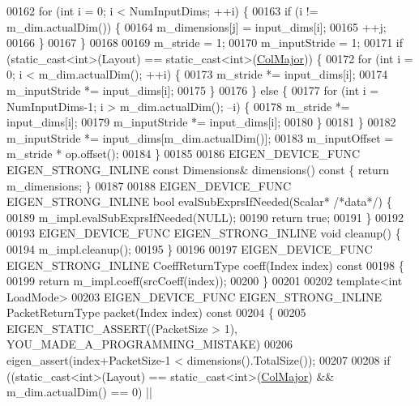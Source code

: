 \begin{DoxyCode}
00162     \textcolor{keywordflow}{for} (\textcolor{keywordtype}{int} i = 0; i < NumInputDims; ++i) \{
00163       \textcolor{keywordflow}{if} (i != m\_dim.actualDim()) \{
00164         m\_dimensions[j] = input\_dims[i];
00165         ++j;
00166       \}
00167     \}
00168 
00169     m\_stride = 1;
00170     m\_inputStride = 1;
00171     \textcolor{keywordflow}{if} (static\_cast<int>(Layout) == \textcolor{keyword}{static\_cast<}\textcolor{keywordtype}{int}\textcolor{keyword}{>}(\hyperlink{group__enums_ggaacded1a18ae58b0f554751f6cdf9eb13a0cbd4bdd0abcfc0224c5fcb5e4f6669a}{ColMajor})) \{
00172       \textcolor{keywordflow}{for} (\textcolor{keywordtype}{int} i = 0; i < m\_dim.actualDim(); ++i) \{
00173         m\_stride *= input\_dims[i];
00174         m\_inputStride *= input\_dims[i];
00175       \}
00176     \} \textcolor{keywordflow}{else} \{
00177       \textcolor{keywordflow}{for} (\textcolor{keywordtype}{int} i = NumInputDims-1; i > m\_dim.actualDim(); --i) \{
00178         m\_stride *= input\_dims[i];
00179         m\_inputStride *= input\_dims[i];
00180       \}
00181     \}
00182     m\_inputStride *= input\_dims[m\_dim.actualDim()];
00183     m\_inputOffset = m\_stride * op.offset();
00184   \}
00185 
00186   EIGEN\_DEVICE\_FUNC EIGEN\_STRONG\_INLINE \textcolor{keyword}{const} Dimensions& dimensions()\textcolor{keyword}{ const }\{ \textcolor{keywordflow}{return} m\_dimensions; \}
00187 
00188   EIGEN\_DEVICE\_FUNC EIGEN\_STRONG\_INLINE \textcolor{keywordtype}{bool} evalSubExprsIfNeeded(Scalar* \textcolor{comment}{/*data*/}) \{
00189     m\_impl.evalSubExprsIfNeeded(NULL);
00190     \textcolor{keywordflow}{return} \textcolor{keyword}{true};
00191   \}
00192 
00193   EIGEN\_DEVICE\_FUNC EIGEN\_STRONG\_INLINE \textcolor{keywordtype}{void} cleanup() \{
00194     m\_impl.cleanup();
00195   \}
00196 
00197   EIGEN\_DEVICE\_FUNC EIGEN\_STRONG\_INLINE CoeffReturnType coeff(Index index)\textcolor{keyword}{ const}
00198 \textcolor{keyword}{  }\{
00199     \textcolor{keywordflow}{return} m\_impl.coeff(srcCoeff(index));
00200   \}
00201 
00202   \textcolor{keyword}{template}<\textcolor{keywordtype}{int} LoadMode>
00203   EIGEN\_DEVICE\_FUNC EIGEN\_STRONG\_INLINE PacketReturnType packet(Index index)\textcolor{keyword}{ const}
00204 \textcolor{keyword}{  }\{
00205     EIGEN\_STATIC\_ASSERT((PacketSize > 1), YOU\_MADE\_A\_PROGRAMMING\_MISTAKE)
00206     eigen\_assert(index+PacketSize-1 < dimensions().TotalSize());
00207 
00208     \textcolor{keywordflow}{if} ((static\_cast<int>(Layout) == static\_cast<int>(\hyperlink{group__enums_ggaacded1a18ae58b0f554751f6cdf9eb13a0cbd4bdd0abcfc0224c5fcb5e4f6669a}{ColMajor}) && m\_dim.actualDim() == 0) ||

\end{DoxyCode}
